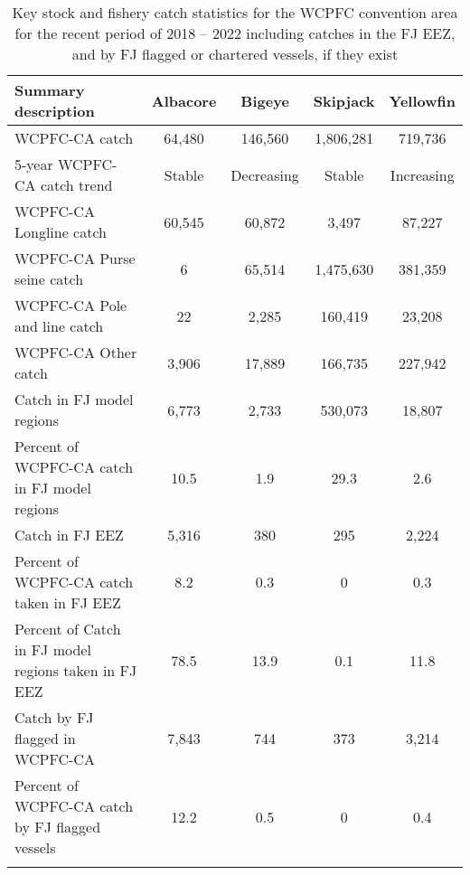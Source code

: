 \begin{longtable}{lcccc}
\caption{Key stock and fishery catch statistics for the WCPFC convention area for the recent period of 2018 -- 2022 including catches in the FJ EEZ, and by FJ flagged or chartered vessels, if they exist} \\ 
  \hline
Summary description & Albacore & Bigeye & Skipjack & Yellowfin \\ 
  \hline
WCPFC-CA catch & 64,480 & 146,560 & 1,806,281 & 719,736 \\ 
  5-year WCPFC-CA catch trend & Stable & Decreasing & Stable & Increasing \\ 
  WCPFC-CA Longline catch & 60,545 & 60,872 & 3,497 & 87,227 \\ 
  WCPFC-CA Purse seine catch & 6 & 65,514 & 1,475,630 & 381,359 \\ 
  WCPFC-CA Pole and line catch & 22 & 2,285 & 160,419 & 23,208 \\ 
  WCPFC-CA Other catch & 3,906 & 17,889 & 166,735 & 227,942 \\ 
  Catch in FJ model regions & 6,773 & 2,733 & 530,073 & 18,807 \\ 
  Percent of WCPFC-CA catch in FJ model regions & 10.5 & 1.9 & 29.3 & 2.6 \\ 
   \hline
Catch in FJ EEZ & 5,316 & 380 & 295 & 2,224 \\ 
  Percent of WCPFC-CA catch taken in FJ EEZ & 8.2 & 0.3 & 0 & 0.3 \\ 
  Percent of Catch in FJ model regions taken in FJ EEZ & 78.5 & 13.9 & 0.1 & 11.8 \\ 
  Catch by FJ flagged in WCPFC-CA & 7,843 & 744 & 373 & 3,214 \\ 
  Percent of WCPFC-CA catch by FJ flagged vessels & 12.2 & 0.5 & 0 & 0.4 \\ 
  \hline
\label{cat_sum_tab}
\end{longtable}
